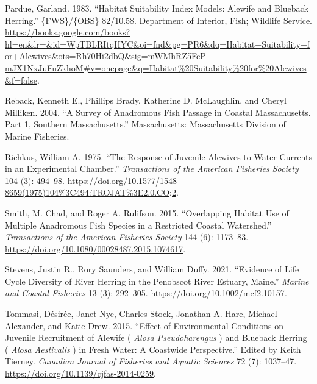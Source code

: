 \documentclass[
]{book}
\newlength{\cslhangindent}
\newlength{\cslentryspacingunit} %
\newenvironment{CSLReferences}[2] %
 {%
  \setlength{\parindent}{0pt}
  \ifodd #1
  \let\oldpar\par
  \def\par{\hangindent=\cslhangindent\oldpar}
  \fi
  \setlength{\parskip}{#2\cslentryspacingunit}
 }%
 {}
\begin{document}
\begin{CSLReferences}{1}{0}
\leavevmode{}%
Pardue, Garland. 1983. {``Habitat {Suitability} {Index} {Models}: {Alewife} and {Blueback} {Herring}.''} \{FWS\}/\{OBS\} 82/10.58. Department of Interior, Fish; Wildlife Service. \url{https://books.google.com/books?hl=en\&lr=\&id=WpTBLRItqHYC\&oi=fnd\&pg=PR6\&dq=Habitat+Suitability+for+Alewives\&ots=Rh70Hi2dbQ\&sig=mWMhRZ5FcP--mJX1NxJuFuZkhoM\#v=onepage\&q=Habitat\%20Suitability\%20for\%20Alewives\&f=false}.

\leavevmode{}%
Reback, Kenneth E., Phillips Brady, Katherine D. McLaughlin, and Cheryl Milliken. 2004. {``A {Survey} of {Anadromous} {Fish} {Passage} in {Coastal} {Massachusetts}. {Part} 1, {Southern} {Massachusetts}.''} Massachusetts: Massachusetts Division of Marine Fisheries.

\leavevmode{}%
Richkus, William A. 1975. {``The {Response} of {Juvenile} {Alewives} to {Water} {Currents} in an {Experimental} {Chamber}.''} \emph{Transactions of the American Fisheries Society} 104 (3): 494--98. \url{https://doi.org/10.1577/1548-8659(1975)104\%3C494:TROJAT\%3E2.0.CO;2}.

\leavevmode{}%
Smith, M. Chad, and Roger A. Rulifson. 2015. {``Overlapping {Habitat} {Use} of {Multiple} {Anadromous} {Fish} {Species} in a {Restricted} {Coastal} {Watershed}.''} \emph{Transactions of the American Fisheries Society} 144 (6): 1173--83. \url{https://doi.org/10.1080/00028487.2015.1074617}.

\leavevmode{}%
Stevens, Justin R., Rory Saunders, and William Duffy. 2021. {``Evidence of {Life} {Cycle} {Diversity} of {River} {Herring} in the {Penobscot} {River} {Estuary}, {Maine}.''} \emph{Marine and Coastal Fisheries} 13 (3): 292--305. \url{https://doi.org/10.1002/mcf2.10157}.

\leavevmode{}%
Tommasi, Désirée, Janet Nye, Charles Stock, Jonathan A. Hare, Michael Alexander, and Katie Drew. 2015. {``Effect of Environmental Conditions on Juvenile Recruitment of Alewife ( \emph{{Alosa} Pseudoharengus} ) and Blueback Herring ( \emph{{Alosa} Aestivalis} ) in Fresh Water: A Coastwide Perspective.''} Edited by Keith Tierney. \emph{Canadian Journal of Fisheries and Aquatic Sciences} 72 (7): 1037--47. \url{https://doi.org/10.1139/cjfas-2014-0259}.


\end{CSLReferences}
\end{document}
